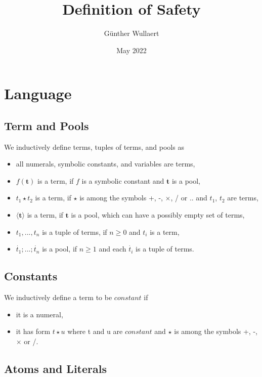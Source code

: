 \documentclass{article}
\title{Definition of Safety}
\author{Günther Wullaert}
\date{May 2022}
\newcommand{\pool}[1]{\boldsymbol{#1}}
\newcommand{\tuple}[1]{\dot{#1}}
\begin{document}
	\maketitle
	
	\section{Language}
	\subsection{Term and Pools}
	
	We inductively define terms, tuples of terms, and pools as
	\begin{itemize}
		\item all numerals, symbolic constants, and variables are terms,
		\item $f(\pool{t})$ is a term, if $f$ is a symbolic constant and $\pool{t}$ is a pool,
		\item $t_1 \star t_2$ is a term, if $\star$ is among the symbols +, -, $\times$, / or .. and $t_1$, $t_2$ are terms,
		\item $\langle \pool{t} \rangle$ is a term, if $\pool{t}$ is a pool, which can have a possibly empty set of terms,
		\item $t_1,...,t_n$ is a tuple of terms, if $n \ge 0$ and $t_i$ is a term,
  		\item $\tuple{t_1};...;\tuple{t_n}$ is a pool, if $n \ge 1$ and each $\tuple{t_i}$ is a tuple of terms.
	\end{itemize}

	\subsection{Constants}

	We inductively define a term to be $\mathit{constant}$ if
	\begin{itemize}
		\item it is a numeral,
		\item it has form $t \star u$ where t and u are $\mathit{constant}$ and $\star$ is among the symbols +, -, $\times$ or /.
	\end{itemize}

	\subsection{Atoms and Literals}
	
\end{document}
